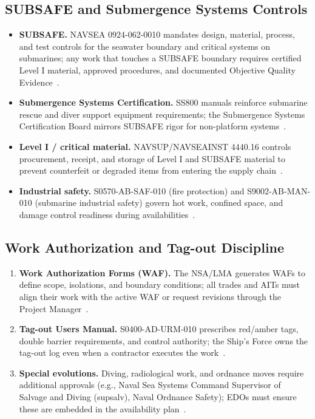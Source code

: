 \documentclass[../main.tex]{subfiles}
\begin{document}
\subsection{SUBSAFE and Submergence Systems Controls}
\begin{itemize}
\item \textbf{SUBSAFE.} NAVSEA 0924-062-0010 mandates design, material, process, and test controls for the seawater boundary and critical systems on submarines; any work that touches a SUBSAFE boundary requires certified Level I material, approved procedures, and documented Objective Quality Evidence~\autocite{NAVSEA-0924-062-0010}.
\item \textbf{Submergence Systems Certification.} SS800 manuals reinforce submarine rescue and diver support equipment requirements; the Submergence Systems Certification Board mirrors SUBSAFE rigor for non-platform systems~\autocite{SS800-AG-MAN-010}.
\item \textbf{Level I / critical material.} NAVSUP/NAVSEAINST 4440.16 controls procurement, receipt, and storage of Level I and SUBSAFE material to prevent counterfeit or degraded items from entering the supply chain~\autocite{NAVSEA-4440-16}.
\item \textbf{Industrial safety.} S0570-AB-SAF-010 (fire protection) and S9002-AB-MAN-010 (submarine industrial safety) govern hot work, confined space, and damage control readiness during availabilities~\autocite{S0570-AB-SAF-010,S9002-AB-MAN-010}.
\end{itemize}

\subsection{Work Authorization and Tag-out Discipline}
\begin{enumerate}
\item \textbf{Work Authorization Forms (WAF).} The NSA/LMA generates WAFs to define scope, isolations, and boundary conditions; all trades and AITs must align their work with the active WAF or request revisions through the Project Manager~\autocite{COMFLTFORCOMINST4790-3}.
\item \textbf{Tag-out Users Manual.} S0400-AD-URM-010 prescribes red/amber tags, double barrier requirements, and control authority; the Ship's Force owns the tag-out log even when a contractor executes the work~\autocite{S0400-AD-URM-010}.
\item \textbf{Special evolutions.} Diving, radiological work, and ordnance moves require additional approvals (e.g., Naval Sea Systems Command Supervisor of Salvage and Diving (\ac{supsalv}), Naval Ordnance Safety); EDOs must ensure these are embedded in the availability plan~\autocite{NAVSEA-4740-2H,edo-4-1-5-waterfront-work-control-2025}.
\end{enumerate}
\end{document}
